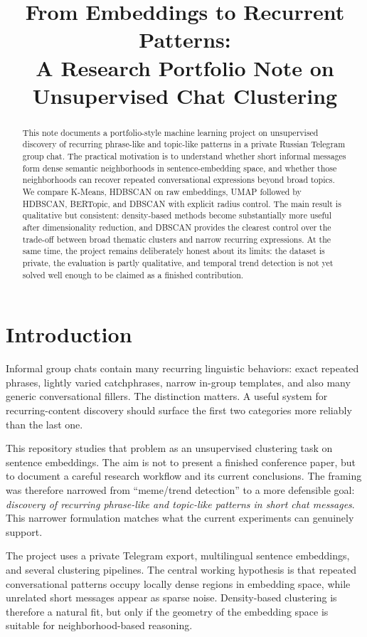 \documentclass{bmvc2k}
\title{From Embeddings to Recurrent Patterns:\\
A Research Portfolio Note on Unsupervised Chat Clustering}
\begin{document}
\maketitle

\begin{abstract}
This note documents a portfolio-style machine learning project on unsupervised discovery of recurring phrase-like and topic-like patterns in a private Russian Telegram group chat. The practical motivation is to understand whether short informal messages form dense semantic neighborhoods in sentence-embedding space, and whether those neighborhoods can recover repeated conversational expressions beyond broad topics. We compare K-Means, HDBSCAN on raw embeddings, UMAP followed by HDBSCAN, BERTopic, and DBSCAN with explicit radius control. The main result is qualitative but consistent: density-based methods become substantially more useful after dimensionality reduction, and DBSCAN provides the clearest control over the trade-off between broad thematic clusters and narrow recurring expressions. At the same time, the project remains deliberately honest about its limits: the dataset is private, the evaluation is partly qualitative, and temporal trend detection is not yet solved well enough to be claimed as a finished contribution.
\end{abstract}

\section{Introduction}
\label{sec:intro}

Informal group chats contain many recurring linguistic behaviors: exact repeated phrases, lightly varied catchphrases, narrow in-group templates, and also many generic conversational fillers. The distinction matters. A useful system for recurring-content discovery should surface the first two categories more reliably than the last one.

This repository studies that problem as an unsupervised clustering task on sentence embeddings. The aim is not to present a finished conference paper, but to document a careful research workflow and its current conclusions. The framing was therefore narrowed from ``meme/trend detection'' to a more defensible goal: \emph{discovery of recurring phrase-like and topic-like patterns in short chat messages}. This narrower formulation matches what the current experiments can genuinely support.

The project uses a private Telegram export, multilingual sentence embeddings, and several clustering pipelines. The central working hypothesis is that repeated conversational patterns occupy locally dense regions in embedding space, while unrelated short messages appear as sparse noise. Density-based clustering is therefore a natural fit, but only if the geometry of the embedding space is suitable for neighborhood-based reasoning.
\end{document}
